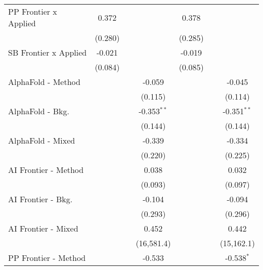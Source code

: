 \begin{tabular}{lcccccc}
   PP Frontier x Applied        & 0.372          &         &               & 0.378          &         &   \\   
                                & (0.280)        &         &               & (0.285)        &         &   \\   
   SB Frontier x Applied        & -0.021         &         &               & -0.019         &         &   \\   
                                & (0.084)        &         &               & (0.085)        &         &   \\   
   AlphaFold - Method           &                &         & -0.059        &                &         & -0.045\\   
                                &                &         & (0.115)       &                &         & (0.114)\\   
   AlphaFold - Bkg.             &                &         & -0.353$^{**}$ &                &         & -0.351$^{**}$\\   
                                &                &         & (0.144)       &                &         & (0.144)\\   
   AlphaFold - Mixed            &                &         & -0.339        &                &         & -0.334\\   
                                &                &         & (0.220)       &                &         & (0.225)\\   
   AI Frontier - Method         &                &         & 0.038         &                &         & 0.032\\   
                                &                &         & (0.093)       &                &         & (0.097)\\   
   AI Frontier - Bkg.           &                &         & -0.104        &                &         & -0.094\\   
                                &                &         & (0.293)       &                &         & (0.296)\\   
   AI Frontier - Mixed          &                &         & 0.452         &                &         & 0.442\\   
                                &                &         & (16,581.4)    &                &         & (15,162.1)\\   
   PP Frontier - Method         &                &         & -0.533        &                &         & -0.538$^{*}$\\   

\end{tabular}
